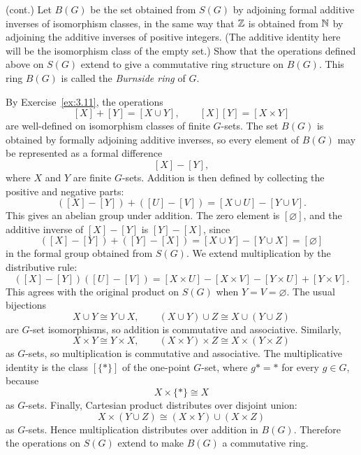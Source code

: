 \documentclass[../Odyssey_Project.tex]{subfiles}
\begin{document}
\begin{exercise}
\label{ex:3.12}
(cont.) Let $B(G)$ be the set obtained from $S(G)$ by adjoining formal additive inverses of isomorphism classes, in the same way that $\mathbb{Z}$ is obtained from $\mathbb{N}$ by adjoining the additive inverses of positive integers. (The additive identity here will be the isomorphism class of the empty set.) Show that the operations defined above on $S(G)$ extend to give a commutative ring structure on $B(G)$. This ring $B(G)$ is called the \emph{Burnside ring} of $G$.
\end{exercise}
\begin{solution}
    By Exercise~\ref{ex:3.11}, the operations
    \[
        [X]+[Y]=[X\cup Y],
        \qquad
        [X][Y]=[X\times Y]
    \]
    are well-defined on isomorphism classes of finite $G$-sets. The set $B(G)$ is obtained by formally adjoining additive inverses, so every element of $B(G)$ may be represented as a formal difference
    \[
        [X]-[Y],
    \]
    where $X$ and $Y$ are finite $G$-sets.
    Addition is then defined by collecting the positive and negative parts:
    \[
        ([X]-[Y])+([U]-[V])
        =
        [X\cup U]-[Y\cup V].
    \]
    This gives an abelian group under addition. The zero element is $[\varnothing]$, and the additive inverse of $[X]-[Y]$ is $[Y]-[X]$, since
    \[
        ([X]-[Y])+([Y]-[X])
        =
        [X\cup Y]-[Y\cup X]
        =
        [\varnothing]
    \]
    in the formal group obtained from $S(G)$.
    We extend multiplication by the distributive rule:
    \[
        ([X]-[Y])([U]-[V])
        =
        [X\times U]-[X\times V]-[Y\times U]+[Y\times V].
    \]
    This agrees with the original product on $S(G)$ when $Y=V=\varnothing$.
    The usual bijections
    \[
        X\cup Y \cong Y\cup X,
        \qquad
        (X\cup Y)\cup Z \cong X\cup (Y\cup Z)
    \]
    are $G$-set isomorphisms, so addition is commutative and associative. Similarly,
    \[
        X\times Y \cong Y\times X,
        \qquad
        (X\times Y)\times Z \cong X\times (Y\times Z)
    \]
    as $G$-sets, so multiplication is commutative and associative.
    The multiplicative identity is the class $[\{*\}]$ of the one-point $G$-set, where $g*=*$ for every $g\in G$, because
    \[
        X\times \{*\}\cong X
    \]
    as $G$-sets.
    Finally, Cartesian product distributes over disjoint union:
    \[
        X\times (Y\cup Z)
        \cong
        (X\times Y)\cup (X\times Z)
    \]
    as $G$-sets. Hence multiplication distributes over addition in $B(G)$.
    Therefore the operations on $S(G)$ extend to make $B(G)$ a commutative ring.
\end{solution}
\end{document}
